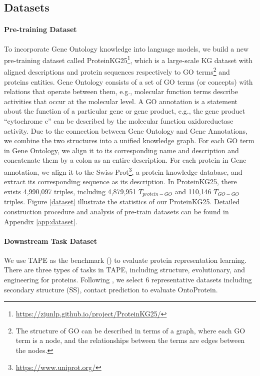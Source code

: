 \subsection{Datasets}
 
\paragraph{Pre-training Dataset}
To incorporate Gene Ontology knowledge into language models, we build a new pre-training dataset called ProteinKG25\footnote{\url{https://zjunlp.github.io/project/ProteinKG25/}}, which is a large-scale KG dataset with aligned descriptions and protein sequences respectively to GO terms\footnote{The structure of GO can be described in terms of a graph, where each GO term is a node, and the relationships between the terms are edges between the nodes.} and proteins entities. 
Gene Ontology consists of a set of GO terms (or concepts) with relations that operate between them, e.g., molecular function terms describe activities that occur at the molecular level.
A GO annotation is a statement about the function of a particular gene or gene product, e.g., the gene product “cytochrome c” can be described by the molecular function oxidoreductase activity.
Due to the connection between Gene Ontology and Gene Annotations, we combine the two structures into a unified knowledge graph. 
For each GO term in Gene Ontology, we align it to its corresponding name and description and concatenate them by a colon as an entire description.
For each protein in Gene annotation, we align it to the Swiss-Prot\footnote{\url{https://www.uniprot.org/}}, a protein knowledge database, and extract its corresponding sequence as its description.
In ProteinKG25, there exists 4,990,097 triples, including 4,879,951 $T_{protein-GO}$ and 110,146 $T_{GO-GO}$ triples. 
Figure \ref{dataset} illustrate the statistics of our ProteinKG25.
Detailed construction procedure and analysis of pre-train datasets can be found in Appendix \ref{app:dataset}.
 
\paragraph{Downstream Task Dataset}

We use TAPE as the benchmark (\cite{DBLP:conf/nips/RaoBTDCCAS19}) to evaluate protein representation learning.
There are three types of tasks in TAPE, including structure, evolutionary, and engineering for proteins.
Following \cite{DBLP:conf/icml/RaoLVMCASR21}, we select 6 representative datasets including secondary structure (SS), contact prediction to evaluate OntoProtein.

